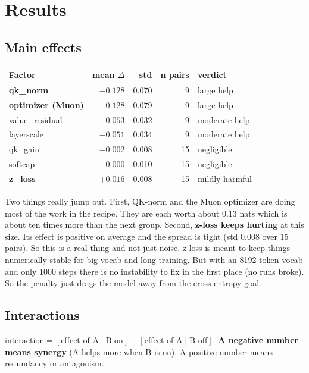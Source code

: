 \documentclass[11pt]{article}
\begin{document}
\section{Results}

\subsection{Main effects}
\label{sec:main}

\begin{table}[h]
\centering
\small
\begin{tabular}{@{}lRRRl@{}}
\toprule
\textbf{Factor} & \textbf{mean $\Delta$} & \textbf{std} & \textbf{n pairs} & \textbf{verdict} \\
\midrule
\textbf{qk\_norm}        & $-0.128$ & 0.070 & 9  & large help \\
\textbf{optimizer (Muon)}& $-0.128$ & 0.079 & 9  & large help \\
value\_residual          & $-0.053$ & 0.032 & 9  & moderate help \\
layerscale               & $-0.051$ & 0.034 & 9  & moderate help \\
qk\_gain                 & $-0.002$ & 0.008 & 15 & negligible \\
softcap                  & $-0.000$ & 0.010 & 15 & negligible \\
\textbf{z\_loss}         & $+0.016$ & 0.008 & 15 & mildly harmful \\
\bottomrule
\end{tabular}
\end{table}

Two things really jump out. First, QK-norm and the Muon optimizer are doing most
of the work in the recipe. They are each worth about 0.13 nats which is about ten
times more than the next group. Second, \textbf{z-loss keeps hurting} at this
size. Its effect is positive on average and the spread is tight (std 0.008 over 15
pairs). So this is a real thing and not just noise. z-loss is meant to keep things
numerically stable for big-vocab and long training. But with an 8192-token vocab
and only 1000 steps there is no instability to fix in the first place (no runs
broke). So the penalty just drags the model away from the cross-entropy goal.

\subsection{Interactions}

$\text{interaction} = [\text{effect of A} \mid \text{B on}] - [\text{effect of A}
\mid \text{B off}]$. \textbf{A negative number means synergy} (A helps more when B
is on). A positive number means redundancy or antagonism.
\end{document}
